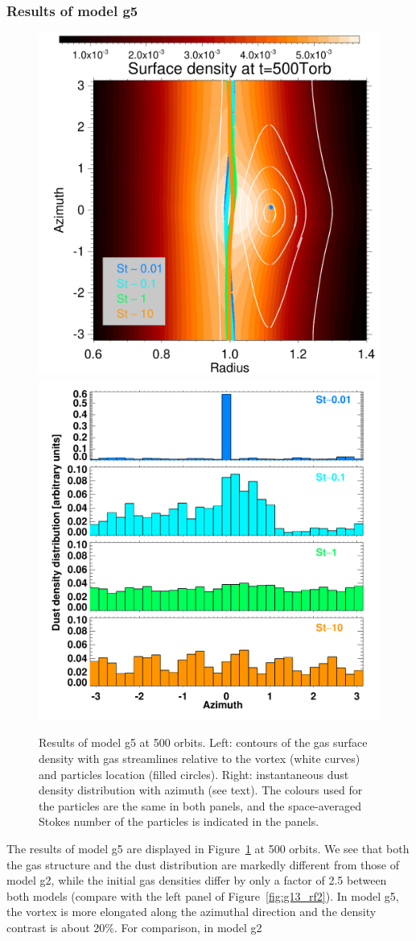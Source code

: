 \documentclass[a4paper,usenatbib]{mnras}
\begin{document}
\subsubsection{Results of model g5}
\label{sec:g5}
\begin{figure}
\centering
 \includegraphics[width=0.47\hsize]{f5a.pdf}
  \includegraphics[width=0.47\hsize]{f5b.pdf}
  \caption{\label{fig:g1_rf2}Results of model g5 at 500 orbits. Left:
    contours of the gas surface density with gas streamlines relative
    to the vortex (white curves) and particles location (filled
    circles). Right: instantaneous dust density distribution with
    azimuth (see text). The colours used for the particles are the
    same in both panels, and the space-averaged Stokes number of the
    particles is indicated in the panels.}
\end{figure}
The results of model g5 are displayed in Figure~\ref{fig:g1_rf2} at
500 orbits. We see that both the gas structure and the dust
distribution are markedly different from those of model g2, while the
initial gas densities differ by only a factor of 2.5 between both
models (compare with the left panel of Figure~\ref{fig:g13_rf2}). In
model g5, the vortex is more elongated along the azimuthal direction
and the density contrast is about 20\%. For comparison, in model g2
\end{document}
